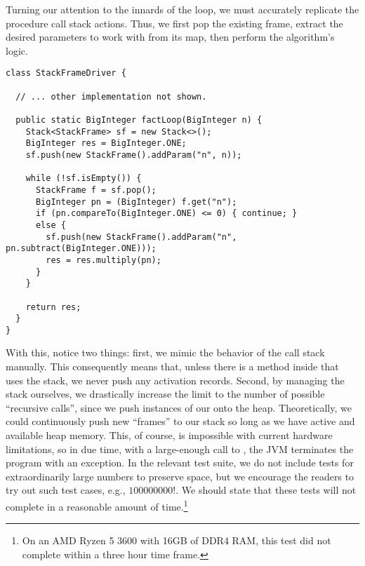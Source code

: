 Turning our attention to the innards of the loop, we must accurately replicate the procedure call stack actions. Thus, we first pop the existing frame, extract the desired parameters to work with from its map, then perform the algorithm's logic.

\begin{cl}{}
\begin{lstlisting}[language=MyJava]
class StackFrameDriver {

  // ... other implementation not shown.

  public static BigInteger factLoop(BigInteger n) {
    Stack<StackFrame> sf = new Stack<>();
    BigInteger res = BigInteger.ONE;
    sf.push(new StackFrame().addParam("n", n));

    while (!sf.isEmpty()) {
      StackFrame f = sf.pop();
      BigInteger pn = (BigInteger) f.get("n");
      if (pn.compareTo(BigInteger.ONE) <= 0) { continue; }
      else {
        sf.push(new StackFrame().addParam("n", pn.subtract(BigInteger.ONE)));
        res = res.multiply(pn);
      }
    }

    return res;
  }
}
\end{lstlisting}
\end{cl}

With this, notice two things: first, we mimic the behavior of the call stack manually. This consequently means that, unless there is a method inside that uses the stack, we never push any activation records. Second, by managing the stack ourselves, we drastically increase the limit to the number of possible ``recursive calls'', since we push instances of our  onto the heap. Theoretically, we could continuously push new ``frames'' to our stack so long as we have active and available heap memory. This, of course, is impossible with current hardware limitations, so in due time, with a large-enough call to , the JVM terminates the program with an  exception. In the relevant test suite, we do not include tests for extraordinarily large numbers to preserve space, but we encourage the readers to try out such test cases, e.g., $100000000!$. We should state that these tests will not complete in a reasonable amount of time.\footnote{On an AMD Ryzen 5 3600 with 16GB of DDR4 RAM, this test did not complete within a three hour time frame.} 